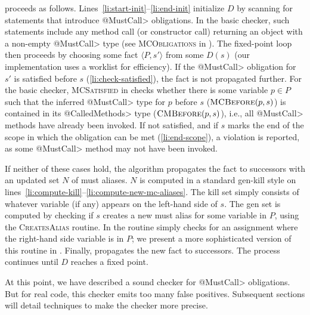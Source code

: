  proceeds as follows.
Lines~\ref{li:start-init}--\ref{li:end-init} initialize $D$ by scanning for
statements that introduce \<@MustCall> obligations.  In the basic checker, such
statements include any method call (or constructor call) returning an object
with a non-empty \<@MustCall> type (see \textsc{MCObligations} in
).  The fixed-point loop then proceeds by choosing some fact
$\langle P, s' \rangle$ from some $D(s)$ (our implementation uses a worklist for
efficiency).  If the \<@MustCall> obligation for $s'$ is satisfied before $s$
(\cref{li:check-satisfied}), the fact is not propagated further. For the basic
checker, \textsc{MCSatisfied} in  checks whether there is some
variable $p \in P$ such that the inferred \<@MustCall> type for $p$ before $s$
($\textsc{MCBefore}(p,s)$) is contained in its \<@CalledMethods> type
($\textsc{CMBefore}(p,s)$), i.e., all \<@MustCall> methods have already been
invoked.
If not satisfied, and if $s$ marks the end of the scope in which the
obligation can be met (\cref{li:end-scope}), a violation is reported, as some
\<@MustCall> method may not have been invoked.

If neither of these cases hold, the algorithm propagates the fact to
successors with an updated set $N$ of must aliases.  $N$ is computed in a
standard gen-kill style on
lines~\ref{li:compute-kill}--\ref{li:compute-new-mc-aliases}.  The kill set
simply consists of whatever variable (if any) appears on the left-hand side of
$s$.  The gen set is computed by checking if $s$ creates a new must alias for
some variable in $P$, using the \textsc{CreatesAlias} routine.  In
 the routine simply checks for an assignment where the
right-hand side variable is in $P$; we present a more sophisticated version of
this routine in .
Finally,  propagates the new fact to successors.  The
process continues until $D$ reaches a fixed point.  

At this point, we have described a sound checker for \<@MustCall> obligations.
But for real code, this checker emits too many false positives.  Subsequent
sections will detail techniques to make the checker more precise.


